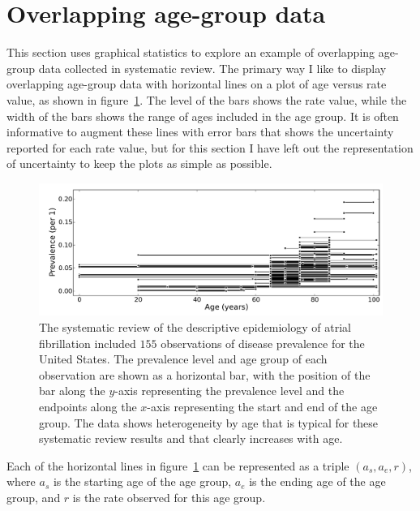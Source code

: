 \section{Overlapping age-group data}
\label{theory-age_group_model-overlapping_data}
This section uses graphical statistics to explore an example of overlapping age-group data
collected in systematic review.  The
primary way I like to display overlapping age-group data with horizontal
lines on a plot of age versus rate value, as shown in
figure~\ref{theory-age_group_model-dismod_data_plot}.  The level of the bars shows
the rate value, while the width of the bars shows the range of ages
included in the age group. It is often informative to augment these
lines with error bars that shows the uncertainty reported for each rate
value, but for this section I have left out the representation of
uncertainty to keep the plots as simple as possible.

\begin{figure}[ht]
\begin{center}
\includegraphics[width=\textwidth]{af_ages_intervals.pdf}
\caption{The systematic review of the descriptive epidemiology of
  atrial fibrillation included $155$ observations of disease prevalence for the United States.
 The prevalence level and age group of
  each observation are shown as a horizontal bar, with the
  position of the bar along the $y$-axis representing the prevalence
  level and the endpoints along the $x$-axis representing the start and
  end of the age group.  The data shows heterogeneity by age that is
  typical for these systematic review results and that clearly increases
 with age.  }
\label{theory-age_group_model-dismod_data_plot}
\end{center}
\end{figure}

Each of the horizontal lines in
figure~\ref{theory-age_group_model-dismod_data_plot} can be
represented as a triple $({a_s}, {a_e}, r)$, where $a_s$ is the
starting age of the age group, $a_e$ is the ending age of the
age group, and $r$ is the rate observed for this age group.

